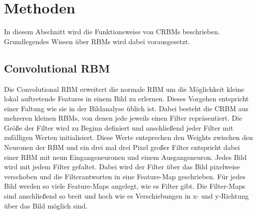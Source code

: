 \section{Methoden}\label{methods}
In diesem Abschnitt wird die Funktionsweise von CRBMs beschrieben.
Grundlegendes Wissen über RBMs wird dabei vorausgesetzt.

\subsection{Convolutional RBM}\label{CRBM}
Die Convolutional RBM erweitert die normale RBM um die Möglichkeit kleine lokal auftretende Features in einem Bild zu erlernen.
Dieses Vorgehen entspricht einer Faltung wie sie in der Bildanalyse üblich ist.
Dabei besteht die CRBM aus mehreren kleinen RBMs, von denen jede jeweils einen Filter repräsentiert.
Die Größe der Filter wird zu Beginn definiert und anschließend jeder Filter mit zufälligen Werten initialisiert.
Diese Werte entsprechen den Weights zwischen den Neuronen der RBM und ein drei mal drei Pixel großer Filter entspricht dabei einer RBM mit neun Eingangsneuronen und einem Ausgangsneuron.
Jedes Bild wird mit jedem Filter gefaltet.
Dabei wird der Filter über das Bild pixelweise verschoben und die Filterantworten in eine Feature-Map geschrieben.
Für jedes Bild werden so viele Feature-Maps angelegt, wie es Filter gibt.
Die Filter-Maps sind anschließend so breit und hoch wie es Verschiebungen in x- und y-Richtung über das Bild möglich sind.

